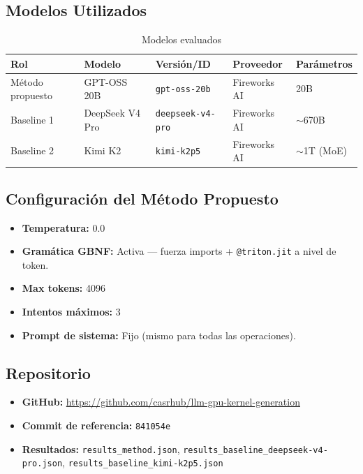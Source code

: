 \documentclass[12pt]{article}
\begin{document}
\subsection{Modelos Utilizados}

\begin{table}[H]
\centering
\caption{Modelos evaluados}
\begin{tabular}{lllll}
\toprule
\textbf{Rol} & \textbf{Modelo} & \textbf{Versión/ID} & \textbf{Proveedor} & \textbf{Parámetros} \\
\midrule
Método propuesto & GPT-OSS 20B & \texttt{gpt-oss-20b} & Fireworks AI & 20B \\
Baseline 1 & DeepSeek V4 Pro & \texttt{deepseek-v4-pro} & Fireworks AI & $\sim$670B \\
Baseline 2 & Kimi K2 & \texttt{kimi-k2p5} & Fireworks AI & $\sim$1T (MoE) \\
\bottomrule
\end{tabular}
\end{table}

\subsection{Configuración del Método Propuesto}

\begin{itemize}
  \item \textbf{Temperatura:} 0.0
  \item \textbf{Gramática GBNF:} Activa — fuerza imports + \texttt{@triton.jit} a nivel de token.
  \item \textbf{Max tokens:} 4096
  \item \textbf{Intentos máximos:} 3
  \item \textbf{Prompt de sistema:} Fijo (mismo para todas las operaciones).
\end{itemize}

\subsection{Repositorio}

\begin{itemize}
  \item \textbf{GitHub:} \url{https://github.com/casrhub/llm-gpu-kernel-generation}
  \item \textbf{Commit de referencia:} \texttt{841054e}
  \item \textbf{Resultados:} \texttt{results\_method.json}, \texttt{results\_baseline\_deepseek-v4-pro.json},
    \texttt{results\_baseline\_kimi-k2p5.json}
\end{itemize}
\end{document}
